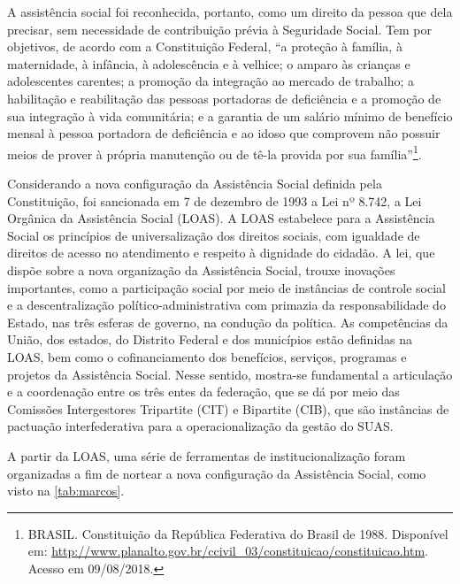 \documentclass[
  brazilian]{report}
\begin{document}
A assistência social foi reconhecida, portanto, como um direito da
pessoa que dela precisar, sem necessidade de contribuição prévia à
Seguridade Social. Tem por objetivos, de acordo com a Constituição
Federal, ``a proteção à família, à maternidade, à infância, à
adolescência e à velhice; o amparo às crianças e adolescentes carentes;
a promoção da integração ao mercado de trabalho; a habilitação e
reabilitação das pessoas portadoras de deficiência e a promoção de sua
integração à vida comunitária; e a garantia de um salário mínimo de
benefício mensal à pessoa portadora de deficiência e ao idoso que
comprovem não possuir meios de prover à própria manutenção ou de tê-la
provida por sua
família''\footnote{BRASIL. Constituição da República Federativa do Brasil de 1988. Disponível em: \url{http://www.planalto.gov.br/ccivil_03/constituicao/constituicao.htm}. Acesso em 09/08/2018.}.

Considerando a nova configuração da Assistência Social definida pela
Constituição, foi sancionada em 7 de dezembro de 1993 a Lei nº 8.742, a
Lei Orgânica da Assistência Social (LOAS). A LOAS estabelece para a
Assistência Social os princípios de universalização dos direitos
sociais, com igualdade de direitos de acesso no atendimento e respeito à
dignidade do cidadão. A lei, que dispõe sobre a nova organização da
Assistência Social, trouxe inovações importantes, como a participação
social por meio de instâncias de controle social e a descentralização
político-administrativa com primazia da responsabilidade do Estado, nas
três esferas de governo, na condução da política. As competências da
União, dos estados, do Distrito Federal e dos municípios estão definidas
na LOAS, bem como o cofinanciamento dos benefícios, serviços, programas
e projetos da Assistência Social. Nesse sentido, mostra-se fundamental a
articulação e a coordenação entre os três entes da federação, que se dá
por meio das Comissões Intergestores Tripartite (CIT) e Bipartite (CIB),
que são instâncias de pactuação interfederativa para a operacionalização
da gestão do SUAS.

A partir da LOAS, uma série de ferramentas de institucionalização foram
organizadas a fim de nortear a nova configuração da Assistência Social,
como visto na \cref{tab:marcos}.

\begin{table}[h]
\caption{Marcos legais da Assistência Social no Brasil.}
\label{tab:marcos}
\end{table}
\end{document}
